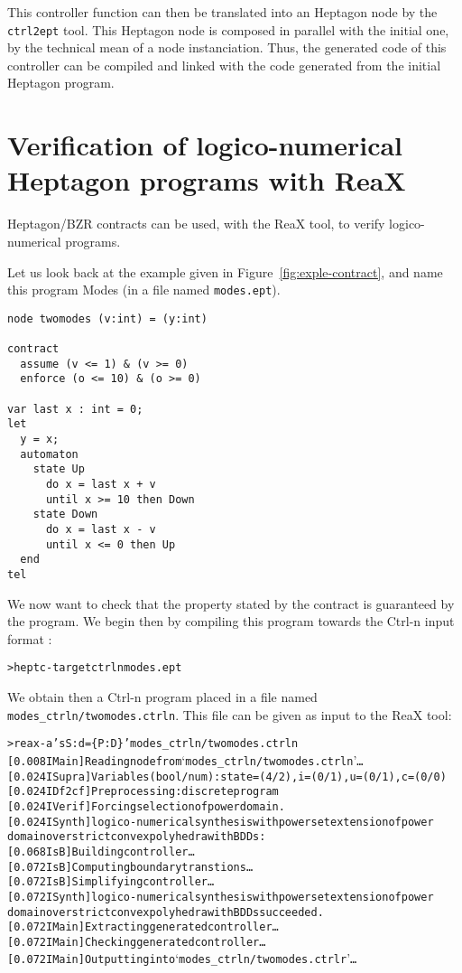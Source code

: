 \documentclass[a4paper]{article}
\begin{document}
This controller function can then be translated into an Heptagon node
by the \texttt{ctrl2ept} tool. This Heptagon node is composed in
parallel with the initial one, by the technical mean of a node
instanciation. Thus, the generated code of this controller can be
compiled and linked with the code generated from the initial Heptagon
program.


\section{Verification of logico-numerical Heptagon programs with ReaX}

Heptagon/BZR contracts can be used, with the ReaX tool, to verify
logico-numerical programs.

Let us look back at the example given in
Figure~\ref{fig:exple-contract}, and name this program Modes (in a
file named \texttt{modes.ept}).
\begin{lstlisting}
node twomodes (v:int) = (y:int)

contract
  assume (v <= 1) & (v >= 0)
  enforce (o <= 10) & (o >= 0)

var last x : int = 0;
let
  y = x;
  automaton
    state Up
      do x = last x + v
      until x >= 10 then Down
    state Down
      do x = last x - v
      until x <= 0 then Up
  end
tel
\end{lstlisting}

We now want to check that the property stated by the contract is
guaranteed by the program. We begin then by compiling this program
towards the Ctrl-n input format :

\begin{alltt}
\textcolor{deepgreen}{> heptc -target ctrln modes.ept}
\end{alltt}

We obtain then a Ctrl-n program placed in a file named
\texttt{modes\_ctrln/twomodes.ctrln}. This file can be given as input
to the ReaX tool:
\begin{alltt}
\textcolor{deepgreen}{> reax -a 'sS:d=\{P:D\}' modes_ctrln/twomodes.ctrln}
[0.008 I Main] Reading node from `modes_ctrln/twomodes.ctrln'…
[0.024 I Supra] Variables(bool/num): state=(4/2), i=(0/1), u=(0/1), c=(0/0)
[0.024 I Df2cf] Preprocessing: discrete program
[0.024 I Verif] Forcing selection of power domain.
[0.024 I Synth] logico-numerical synthesis with powerset extension of power
                domain over strict convex polyhedra with BDDs:
[0.068 I sB] Building controller…
[0.072 I sB] Computing boundary transtions…
[0.072 I sB] Simplifying controller…
[0.072 I Synth] {\color{red}logico-numerical synthesis with powerset extension of power
                domain over strict convex polyhedra with BDDs succeeded.}
[0.072 I Main] Extracting generated controller…
[0.072 I Main] Checking generated controller…
[0.072 I Main] Outputting into `modes_ctrln/twomodes.ctrlr'…
\end{alltt}
\end{document}
